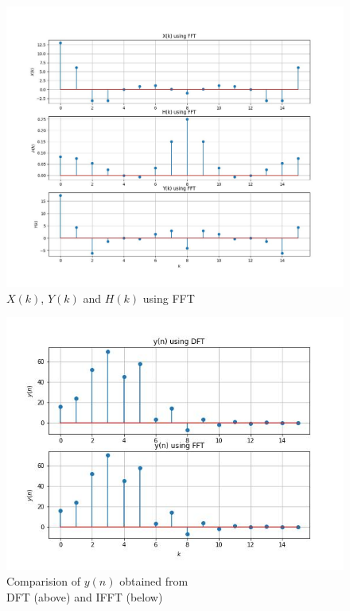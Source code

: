 \documentclass[journal,12pt,twocolumn]{IEEEtran}
\renewcommand\thesection{\arabic{section}}
\begin{document}
\begin{enumerate}[label=\thesection.\arabic*]
\begin{figure}[!ht]
		\includegraphics[width=\columnwidth]{./figs/e6.4-FFT.jpg}
		\caption{$X(k)$, $Y(k)$ and $H(k)$ using FFT}
		\label{fig:fft}
	\end{figure}
	\begin{figure}[!ht]
	\centering
	\includegraphics[width=\columnwidth]{./figs/e6.4DFT-FFT.jpg}
	\caption{Comparision of $y(n)$ obtained from \\ DFT (above) and IFFT (below)}
	\label{fig:dftfft}
	\end{figure}
	\end{enumerate}
	
\end{document}
